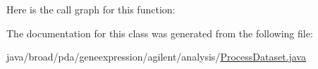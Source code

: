 Here is the call graph for this function\+:




The documentation for this class was generated from the following file\+:\begin{DoxyCompactItemize}
\item 
java/broad/pda/geneexpression/agilent/analysis/\hyperlink{_process_dataset_8java}{Process\+Dataset.\+java}\end{DoxyCompactItemize}
